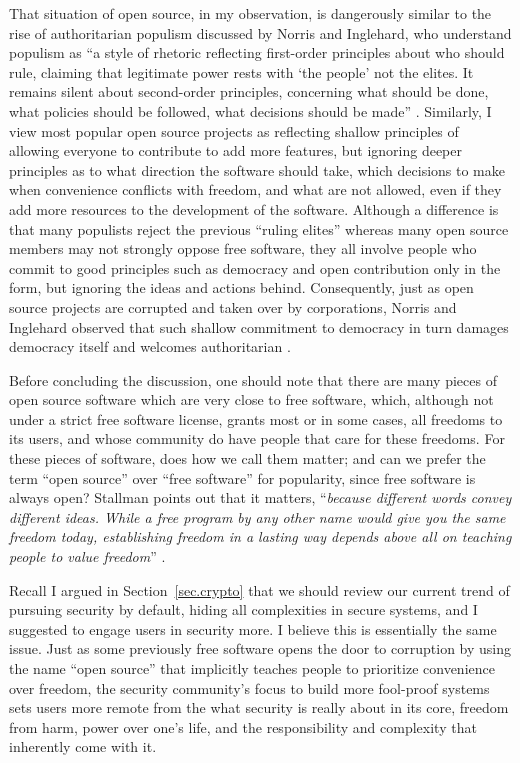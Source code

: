 \documentclass[10pt]{article}
\begin{document}
That situation of open source, in my observation, is dangerously similar to the
rise of authoritarian populism discussed by Norris and Inglehard, who
understand populism as ``a style of rhetoric reflecting first-order principles
about who should rule, claiming that legitimate power rests with `the people'
not the elites. It remains silent about second-order principles, concerning
what should be done, what policies should be followed, what decisions should be
made'' \cite[p.~4]{cultural.backlash}. Similarly, I view most popular open
source projects as reflecting shallow principles of allowing everyone to
contribute to add more features, but ignoring deeper principles as to what
direction the software should take, which decisions to make when convenience
conflicts with freedom, and what are not allowed, even if they add more
resources to the development of the software. Although a difference is that
many populists reject the previous ``ruling elites'' whereas many open source
members may not strongly oppose free software, they all involve people who
commit to good principles such as democracy and open contribution only in the
form, but ignoring the ideas and actions behind.  Consequently, just as open
source projects are corrupted and taken over by corporations, Norris and
Inglehard observed that such shallow commitment to democracy in turn damages
democracy itself and welcomes authoritarian \cite{cultural.backlash}.

Before concluding the discussion, one should note that there are many pieces of
open source software which are very close to free software, which, although not
under a strict free software license, grants most or in some cases, all
freedoms to its users, and whose community do have people that care for these
freedoms. For these pieces of software, does how we call them matter; and can
we prefer the term ``open source'' over ``free software'' for popularity, since
free software is always open?  Stallman points out that it matters,
``\emph{because different words convey different ideas. While a free program by
any other name would give you the same freedom today, establishing freedom in a
lasting way depends above all on teaching people to value freedom}''
\cite[Essay~14]{stallman.essays}. 

Recall I argued in Section~\ref{sec.crypto} that we should review our current
trend of pursuing security by default, hiding all complexities in secure
systems, and I suggested to engage users in security more. I believe this is
essentially the same issue. Just as some previously free software opens the
door to corruption by using the name ``open source'' that implicitly teaches
people to prioritize convenience over freedom, the security community's focus
to build more fool-proof systems sets users more remote from the what security
is really about in its core, freedom from harm, power over one's life, and the
responsibility and complexity that inherently come with it.
\end{document}
